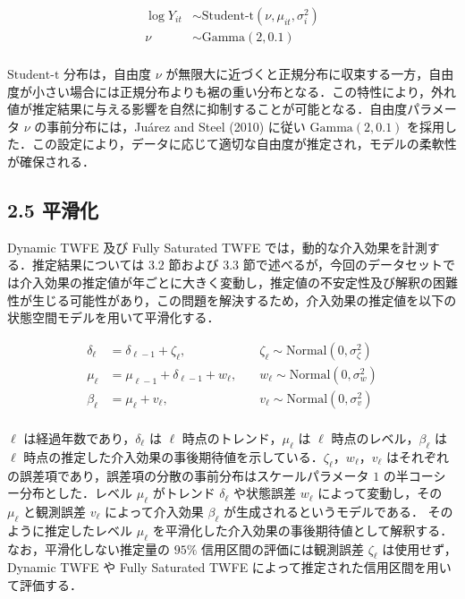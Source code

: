\[
\begin{aligned}
\log{Y_{it}} &\sim \text{Student-t} (\nu, \mu_{it}, \sigma_i^2) \\
\nu &\sim \text{Gamma}(2, 0.1) \\
\end{aligned}
\]

\(\text{Student-t}\) 分布は，自由度 \(\nu\)
が無限大に近づくと正規分布に収束する一方，自由度が小さい場合には正規分布よりも裾の重い分布となる．この特性により，外れ値が推定結果に与える影響を自然に抑制することが可能となる．自由度パラメータ
\(\nu\) の事前分布には，Juárez and Steel (2010) に従い
\(\text{Gamma}(2, 0.1)\)
を採用した．この設定により，データに応じて適切な自由度が推定され，モデルの柔軟性が確保される．

\hypertarget{ux5e73ux6ed1ux5316}{%
\subsection{2.5 平滑化}\label{ux5e73ux6ed1ux5316}}

Dynamic TWFE 及び Fully Saturated TWFE
では，動的な介入効果を計測する．推定結果については \(3.2\) 節および
\(3.3\)
節で述べるが，今回のデータセットでは介入効果の推定値が年ごとに大きく変動し，推定値の不安定性及び解釈の困難性が生じる可能性があり，この問題を解決するため，介入効果の推定値を以下の状態空間モデルを用いて平滑化する．

\[
\begin{aligned}
\delta_{\ell} &= \delta_{\ell-1} + \zeta_{\ell}, \quad &\zeta_{\ell} \sim \text{Normal}(0, \sigma_{\zeta}^2)\\
\mu_{\ell} &= \mu_{\ell-1} + \delta_{\ell-1} + w_{\ell}, \quad &w_{\ell} \sim \text{Normal}(0, \sigma_{w}^2)\\
\beta_{\ell} &= \mu_{\ell} + v_{\ell}, \quad &v_{\ell} \sim \text{Normal}(0, \sigma_{v}^2)\\
\end{aligned}
\]

\(\ell\) は経過年数であり，\(\delta_{\ell}\) は \(\ell\)
時点のトレンド，\(\mu_{\ell}\) は \(\ell\)
時点のレベル，\(\beta_{\ell}\) は \(\ell\)
時点の推定した介入効果の事後期待値を示している．\(\zeta_{\ell}\)，\(w_{\ell}\)，\(v_{\ell}\)
はそれぞれの誤差項であり，誤差項の分散の事前分布はスケールパラメータ
\(1\) の半コーシー分布とした．レベル \(\mu_{\ell}\) がトレンド
\(\delta_{\ell}\) や状態誤差 \(w_{\ell}\) によって変動し，その
\(\mu_{\ell}\) と観測誤差 \(v_{\ell}\) によって介入効果 \(\beta_{\ell}\)
が生成されるというモデルである． そのように推定したレベル \(\mu_{\ell}\)
を平滑化した介入効果の事後期待値として解釈する．なお，平滑化しない推定量の
\(95\%\) 信用区間の評価には観測誤差 \(\zeta_{\ell}\) は使用せず，Dynamic
TWFE や Fully Saturated TWFE
によって推定された信用区間を用いて評価する．

